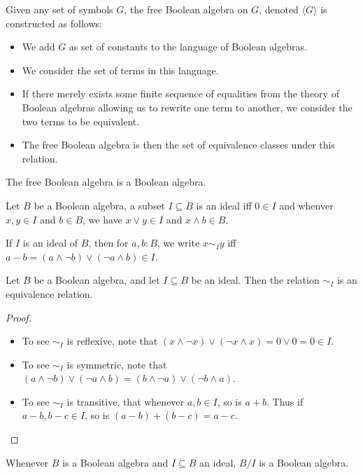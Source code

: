 \documentclass{../util/zariski-small}
\begin{document}
\begin{definition}
  Given any set of symbols $G$, the free Boolean algebra on $G$, denoted $\langle G \rangle$
  is constructed as follows:
  \begin{itemize}
    \item We add $G$ as set of constants to the language of Boolean algebras. 
    \item We consider the set of terms in this language. 
    \item If there merely exists some finite sequence of 
      equalities from the theory of Boolean algebras allowing us to rewrite one term to another, 
      we consider the two terms to be equivalent. 
    \item The free Boolean algebra is then the set of equivalence classes under this relation. 
  \end{itemize}
\end{definition}
\begin{remark}
  The free Boolean algebra is a Boolean algebra. 
\end{remark}
\begin{definition}
  Let $B$ be a Boolean algebra, a subset $I\subseteq B$ is an ideal iff 
  $0\in I$ and whenver $x,y \in I$ and $b\in B$, we have $x\vee y \in I$ and $x \wedge b \in B$. 

  If $I$ is an ideal of $B$, then for $a,b:B$, we write $x\sim_I y$ iff 
  $a - b  = 
  (a \wedge \neg b ) \vee ( \neg a \wedge b) 
  \in I$. 
\end{definition}
\begin{lemma}
  Let $B$ be a Boolean algebra, and let $I\subseteq B$ be an ideal. 
  Then the relation $\sim_I$ is an equivalence relation. 
\end{lemma}
\begin{proof}
  \begin{itemize}
    \item To see $\sim_I$ is reflexive, note that 
      $(x \wedge \neg x) \vee (\neg x \wedge x) = 0 \vee 0 = 0 \in I$. 
    \item To see $\sim_I$ is symmetric, note that 
      $ (a \wedge \neg b) \vee ( \neg a \wedge b) = 
        (b \wedge \neg a) \vee ( \neg b \wedge a)$. 
    \item To see $\sim_I$ is transitive, that 
      whenever $a,b \in I$, so is $ a + b$. 
      Thus if $a -b , b -c \in I$, so is 
      $(a -b) + (b-c) = a -c$.
  \end{itemize}
\end{proof}
\begin{lemma}
  Whenever $B$ is a Boolean algebra and $I\subseteq B$ an ideal, 
  $B/I$ is a Boolean algebra. 
\end{lemma}
\end{document}
